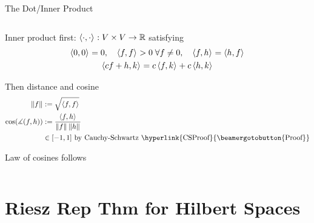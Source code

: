 \documentclass[10pt,compress,xcolor={usenames,dvipsnames},aspectratio=169]{beamer}
\begin{document}
\begin{frame}[label = dotproduct]{The Dot/Inner Product}
\begin{columns}
\begin{column}{0.5\textwidth}
{ \medskip
 
Inner product first:  $\left \langle \cdot, \cdot \right \rangle_{{}} :  V \times V \to \mathbb{R}$ satisfying
 \vspace{-1.5ex}
 \begin{gather*}
 \left \langle 0, 0 \right \rangle_{{}} =0, \quad \left \langle f, f \right \rangle_{{}} > 0 \; \forall f \ne 0, \quad
 \left \langle f, h \right \rangle_{{}} =\left \langle h, f \right \rangle_{{}} \\
  \left \langle cf+h, k \right \rangle_{{}} = c \left \langle f, k \right \rangle_{{}} + c\left \langle h, k \right \rangle_{{}} 
 \end{gather*}

\vspace{-1.5ex}
Then distance and cosine
\vspace{-1.5ex}
 \begin{align*}
 	\norm{f} & := \sqrt{\ip{f}{f}}
 	\\
 	\cos(\measuredangle(f,h)) & : = \frac{\ip{f}{h}}{\norm{f}\norm{h}}  \\
 	& \in [-1,1] \text{ by Cauchy-Schwartz \hyperlink{CSProof}{\beamergotobutton{Proof}}}
  \end{align*}
 
 \vspace{-1.5ex}
 Law of cosines follows 

}
\end{column}
\end{columns}

\end{frame}

\section{Riesz Rep Thm for Hilbert Spaces}
\end{document}

